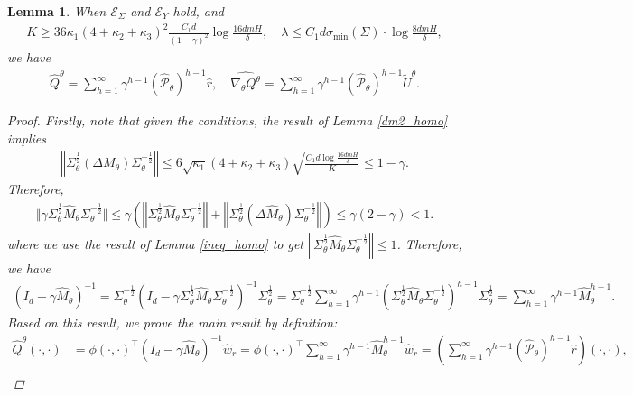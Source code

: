 \documentclass{article}
\newtheorem{lemma}{Lemma}[section]
\numberwithin{equation}{section}
\begin{document}
\begin{lemma}
\label{Q_hat_decomp_homo}
When $\mathcal{E}_\Sigma$ and $\mathcal{E}_Y$ hold, and 
\begin{align*}
    K\geq 36\kappa_1(4+\kappa_2+\kappa_3)^2\frac{C_1d}{(1-\gamma)^2}\log\frac{16dmH}{\delta},\quad\lambda\leq C_1d\sigma_{\textrm{min}}(\Sigma)\cdot\log\frac{8dmH}{\delta},
\end{align*}
we have
\begin{align*}
    \widehat{Q}^\theta=\sum_{h=1}^\infty\gamma^{h-1}\left(\widehat{\mathcal{P}}_\theta\right)^{h-1}\widehat{r},\quad\widehat{\nabla_\theta Q^\theta}=\sum_{h=1}^\infty\gamma^{h-1}\left(\widehat{\mathcal{P}}_\theta\right)^{h-1}\tilde{U}^\theta.
\end{align*}
\begin{proof}
Firstly, note that given the conditions, the result of Lemma \ref{dm2_homo} implies
\begin{align*}
    \left\Vert\Sigma_\theta^{\frac{1}{2}}\left(\Delta M_\theta\right)\Sigma_\theta^{-\frac{1}{2}}\right\Vert\leq 6\sqrt{\kappa_1}(4+\kappa_2+\kappa_3)\sqrt{\frac{C_1d\log\frac{16dmH}{\delta}}{K}}\leq 1-\gamma.
\end{align*}
Therefore, 
\begin{align*}
\Vert\gamma\Sigma_\theta^{\frac{1}{2}}\widehat{M}_\theta\Sigma_\theta^{-\frac{1}{2}}\Vert\leq \gamma\left(\left\Vert\Sigma_\theta^{\frac{1}{2}}\widehat{M}_\theta\Sigma_\theta^{-\frac{1}{2}}\right\Vert + \left\Vert\Sigma_\theta^{\frac{1}{2}}\left(\Delta\widehat{M}_\theta\right)\Sigma_\theta^{-\frac{1}{2}}\right\Vert\right)\leq \gamma(2-\gamma) < 1. 
\end{align*}
where we use the result of Lemma \ref{ineq_homo} to get $\left\Vert\Sigma_\theta^{\frac{1}{2}}\widehat{M}_\theta\Sigma_\theta^{-\frac{1}{2}}\right\Vert\leq 1$. Therefore, we have 
\begin{align*}
\left(I_d - \gamma\widehat{M}_\theta\right)^{-1} = \Sigma_\theta^{-\frac{1}{2}}\left(I_d - \gamma\Sigma_\theta^{\frac{1}{2}}\widehat{M}_\theta\Sigma_\theta^{-\frac{1}{2}}\right)^{-1}\Sigma_\theta^{\frac{1}{2}}=\Sigma_\theta^{-\frac{1}{2}}\sum_{h=1}^\infty\gamma^{h-1}\left(\Sigma_\theta^{\frac{1}{2}}\widehat{M}_\theta\Sigma_\theta^{-\frac{1}{2}}\right)^{h-1}\Sigma_\theta^{\frac{1}{2}} = \sum_{h=1}^\infty\gamma^{h-1}\widehat{M}_\theta^{h-1}. 
\end{align*}
Based on this result, we prove the main result by definition:
\begin{align*}
\widehat{Q}^\theta(\cdot,\cdot) &= \phi(\cdot,\cdot)^\top\left(I_d-\gamma\widehat{M}_\theta\right)^{-1}\widehat{w}_r=\phi(\cdot,\cdot)^\top\sum_{h=1}^\infty\gamma^{h-1}\widehat{M}_\theta^{h-1}\widehat{w}_r=\left(\sum_{h=1}^\infty\gamma^{h-1}\left(\widehat{\mathcal{P}}_\theta\right)^{h-1}\widehat{r}\right)(\cdot,\cdot),\\

\end{align*}
\end{proof}
\end{lemma}
\end{document}
